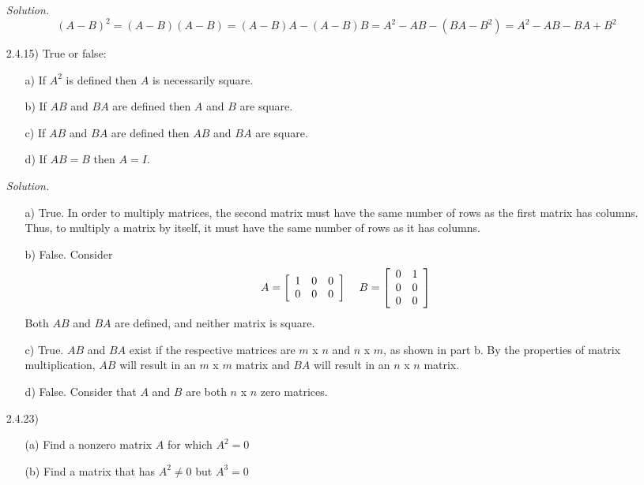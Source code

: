 \documentclass[12pt]{article}
\begin{document}
\begin{itemize}
\textit{Solution.}
\begin{equation*}
(A-B)^2=(A-B)(A-B)=(A-B)A-(A-B)B=A^2-AB-(BA-B^2) = A^2-AB-BA+B^2
\end{equation*}

\item[2.4.15)] True or false:
	\begin{itemize}
	\item[a)] If $A^2$ is defined then $A$ is necessarily square.
    \item[b)] If $AB$ and $BA$ are defined then $A$ and $B$ are square.
    \item[c)] If $AB$ and $BA$ are defined then $AB$ and $BA$ are square.
    \item[d)] If $AB=B$ then $A=I$.
	\end{itemize}
    
\textit{Solution.}
	\begin{itemize}
	\item[a)] True. In order to multiply matrices, the second matrix must have the same number of rows as the first matrix has columns. Thus, to multiply a matrix by itself, it must have the same number of rows as it has columns.
    \item[b)] False. Consider 
    \begin{equation*} A =
    \left[\begin{array}{ccc} 1 & 0 & 0 \\ 0 & 0 & 0\end{array}\right]
    \hspace{4mm} B = 
    \left[\begin{array}{cc} 0 & 1 \\ 0 & 0 \\ 0 & 0\end{array}\right]
    \end{equation*}
    Both $AB$ and $BA$ are defined, and neither matrix is square.
    \item[c)] True. $AB$ and $BA$ exist if the respective matrices are $m$ x $n$ and $n$ x $m$, as shown in part b. By the properties of matrix multiplication, $AB$ will result in an $m$ x $m$ matrix and $BA$ will result in an $n$ x $n$ matrix.
    \item[d)] False. Consider that $A$ and $B$ are both $n$ x $n$ zero matrices.
	\end{itemize}

\item[2.4.23)]
	\begin{itemize}
	\item[(a)] Find a nonzero matrix $A$ for which $A^2=0$
    \item[(b)] Find a matrix that has $A^2 \neq 0$ but $A^3 = 0$
	\end{itemize}


\end{itemize}
\end{document}
